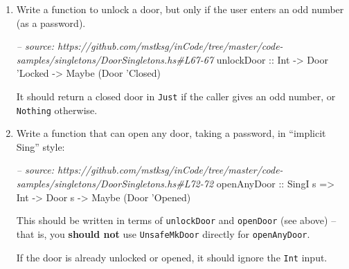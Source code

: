 \documentclass[]{article}
\newenvironment{Shaded}{}{}
\newcommand{\DataTypeTok}[1]{\textcolor[rgb]{0.56,0.13,0.00}{#1}}
\newcommand{\CharTok}[1]{\textcolor[rgb]{0.25,0.44,0.63}{#1}}
\newcommand{\CommentTok}[1]{\textcolor[rgb]{0.38,0.63,0.69}{\textit{#1}}}
\newcommand{\OtherTok}[1]{\textcolor[rgb]{0.00,0.44,0.13}{#1}}
\newcommand{\NormalTok}[1]{#1}
\begin{document}
\begin{enumerate}
\def\labelenumi{\arabic{enumi}.}
\item
  Write a function to unlock a door, but only if the user enters an odd number
  (as a password).

\begin{Shaded}
\begin{Highlighting}[]
\CommentTok{-- source: https://github.com/mstksg/inCode/tree/master/code-samples/singletons/DoorSingletons.hs#L67-67}
\OtherTok{unlockDoor ::} \DataTypeTok{Int} \OtherTok{->} \DataTypeTok{Door} \CharTok{'Locked -> Maybe (Door '}\DataTypeTok{Closed}\NormalTok{)}
\end{Highlighting}
\end{Shaded}

  It should return a closed door in \texttt{Just} if the caller gives an odd
  number, or \texttt{Nothing} otherwise.
\item
  Write a function that can open any door, taking a password, in ``implicit
  Sing'' style:

\begin{Shaded}
\begin{Highlighting}[]
\CommentTok{-- source: https://github.com/mstksg/inCode/tree/master/code-samples/singletons/DoorSingletons.hs#L72-72}
\OtherTok{openAnyDoor ::} \DataTypeTok{SingI}\NormalTok{ s }\OtherTok{=>} \DataTypeTok{Int} \OtherTok{->} \DataTypeTok{Door}\NormalTok{ s }\OtherTok{->} \DataTypeTok{Maybe}\NormalTok{ (}\DataTypeTok{Door} \CharTok{'Opened)}
\end{Highlighting}
\end{Shaded}

  This should be written in terms of \texttt{unlockDoor} and \texttt{openDoor}
  (see above) -- that is, you \textbf{should not} use \texttt{UnsafeMkDoor}
  directly for \texttt{openAnyDoor}.

  If the door is already unlocked or opened, it should ignore the \texttt{Int}
  input.
\end{enumerate}
\end{document}
